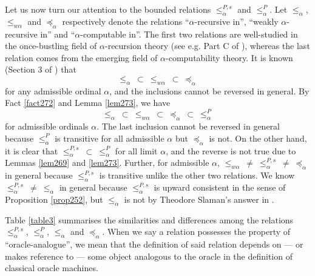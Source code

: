 \documentclass[12pt]{article}
\numberwithin{equation}{section}
\begin{document}
Let us now turn our attention to the bounded relations $\leq^{P, s}_{\alpha}$ and $\leq^P_{\alpha}$. Let $\leq_{\alpha}$, $\leq_{w \alpha}$ and $\preceq_{\alpha}$ respectively denote the relations ``$\alpha$-recursive in'', ``weakly $\alpha$-recursive in'' and ``$\alpha$-computable in''. The first two relations are well-studied in the once-bustling field of $\alpha$-recursion theory (see e.g. Part C of \cite{sacks}), whereas the last relation comes from the emerging field of $\alpha$-computability theory. It is known (Section 3 of \cite{koepke2}) that 
\begin{equation*}
    \leq_{\alpha} \ \subset \ \leq_{w \alpha} \ \subset \ \preceq_{\alpha}
\end{equation*}
for any admissible ordinal $\alpha$, and the inclusions cannot be reversed in general. By Fact \ref{fact272} and Lemma \ref{lem273}, we have
\begin{equation}\label{eq2}
    \leq_{\alpha} \ \subset \ \leq_{w \alpha} \ \subset \ \preceq_{\alpha} \ \subset \ \leq^P_{\alpha}
\end{equation}
for admissible ordinals $\alpha$. The last inclusion cannot be reversed in general because $\leq^P_{\alpha}$ is transitive for all admissible $\alpha$ but $\preceq_{\alpha}$ is not. On the other hand, it is clear that $\leq^{P, s}_{\alpha} \ \subset \ \leq^P_{\alpha}$ for all limit $\alpha$, and the reverse is not true due to Lemmas \ref{lem269} and \ref{lem273}. Further, for admissible $\alpha$, $\leq_{w \alpha} \ \neq \ \leq^{P, s}_{\alpha} \ \neq \ \preceq_{\alpha}$ in general because $\leq^{P, s}_{\alpha}$ is transitive unlike the other two relations. We know $\leq^{P, s}_{\alpha} \ \neq \ \leq_{\alpha}$ in general because $\leq^{P, s}_{\alpha}$ is upward consistent in the sense of Proposition \ref{prop252}, but $\leq_{\alpha}$ is not by Theodore Slaman's answer in \cite{slaman}. 

Table \ref{table3} summarises the similarities and differences among the relations $\leq^{P, s}_{\alpha}$, $\leq^P_{\alpha}$, $\leq_{\alpha}$ and $\preceq_{\alpha}$. When we say a relation possesses the property of ``oracle-analogue'', we mean that the definition of said relation depends on --- or makes reference to --- some object analogous to the oracle in the definition of classical oracle machines.
\end{document}
